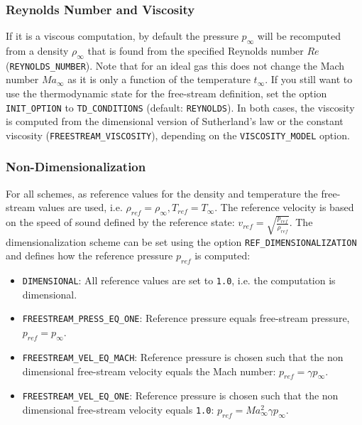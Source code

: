 \documentclass[12pt, a4paper, twoside]{article}
\begin{document}
\subsubsection{Reynolds Number and Viscosity}

If it is a viscous computation, by default the pressure \(p_\infty\) will be recomputed from a density \(\rho_\infty\) that is found from the specified Reynolds number \(Re\) (\verb|REYNOLDS_NUMBER|). Note that for an ideal gas this does not change the Mach number \(Ma_\infty\) as it is only a function of the temperature \(t_\infty\). If you still want to use the thermodynamic state for the free-stream definition, set the option \verb|INIT_OPTION| to \verb|TD_CONDITIONS| (default: \verb|REYNOLDS|). In both cases, the viscosity is computed from the dimensional version of Sutherland’s law or the constant viscosity (\verb|FREESTREAM_VISCOSITY|), depending on the \verb|VISCOSITY_MODEL| option.


\subsubsection{Non-Dimensionalization}

For all schemes, as reference values for the density and temperature the free-stream values are used, i.e. \(\rho_{ref} = \rho_\infty, T_{ref} = T_\infty\). The reference velocity is based on the speed of sound defined by the reference state: \(v_{ref} = \sqrt{\frac{p_{ref}}{\rho_{ref}}}\). The dimensionalization scheme can be set using the option \verb|REF_DIMENSIONALIZATION| and defines how the reference pressure \(p_{ref}\) is computed:

\begin{itemize}
    \item \verb|DIMENSIONAL|: All reference values are set to \verb|1.0|, i.e. the computation is dimensional.
    \item \verb|FREESTREAM_PRESS_EQ_ONE|: Reference pressure equals free-stream pressure, \(p_{ref} = p_\infty\).
    \item \texttt{FREESTREAM\_VEL\_EQ\_MACH}: Reference pressure is chosen such that the non dimensional free-stream velocity equals the Mach number: \(p_{ref} = \gamma p_\infty\).
    \item \verb|FREESTREAM_VEL_EQ_ONE|: Reference pressure is chosen such that the non dimensional free-stream velocity equals \verb|1.0|: \(p_{ref} = Ma_\infty^2\gamma p_\infty\).
\end{itemize}
\end{document}
